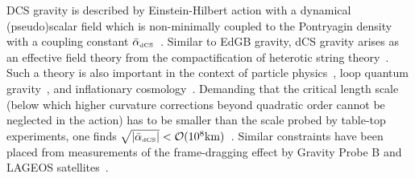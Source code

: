\documentclass[prd,twocolumn,nofootinbib]{revtex4-1}
\newcommand{\DCS}{{\mbox{\tiny dCS}}}
\begin{document}
DCS gravity is described by Einstein-Hilbert action with a dynamical (pseudo)scalar field which is non-minimally coupled to the Pontryagin density with a coupling constant $\bar{\alpha}_{\DCS}$~\cite{Alexander:2009tp,Jackiw:2003pm}. Similar to EdGB gravity, dCS gravity arises as an effective field theory from the compactification of  heterotic string theory~\cite{GREEN1984117,McNees:2015srl}. Such a theory is also important in the context of particle physics~\cite{Alexander:2009tp,Mariz:2004cv,MARIZ2008312,PhysRevD.78.025029}, loop quantum gravity~\cite{PhysRevD.80.104007,Taveras:2008yf}, and inflationary cosmology~\cite{Weinberg:2008hq}. Demanding that the critical length scale (below which higher curvature corrections beyond quadratic order cannot be neglected in the action) has to be smaller than the scale probed by table-top experiments, one finds $\sqrt{|\bar{\alpha}_{\DCS}|} < \mathcal{O}(10^8 \text{km})$~\cite{Yagi:2012ya}. Similar constraints have been placed from measurements of the frame-dragging effect by Gravity Probe B and LAGEOS satellites~\cite{AliHaimoud:2011fw}.

\end{document}
